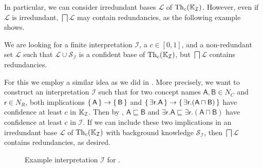 In particular, we can consider irredundant bases $\mathcal{L}$ of $\operatorname{Th}_c({\mathbb{K}}_{\mathcal{I}})$.  However, even if $\mathcal{L}$ is irredundant, $\bigsqcap \mathcal{L}$
may contain redundancies, as the following example shows.

\begin{Example}
  \label{expl:nonredundant-implicational-base-yields-redundant-gci-base}
  We are looking for a finite interpretation $\mathcal{I}$, a $c \in [0,1]$, and a
  non-redundant set $\mathcal{L}$ such that $\mathcal{L} \cup \mathcal{S}_{\mathcal{I}}$
  is a confident base of $\operatorname{Th}_c({\mathbb{K}}_{\mathcal{I}})$, but $\bigsqcap \mathcal{L}$
  contains redundancies.

  For this we employ a similar idea as we did in
  .  More precisely, we
  want to construct an interpretation $\mathcal{I}$ such that for two concept names
  $\mathsf{A}, \mathsf{B} \in N_C$ and $\mathsf{r} \in N_R$, both implications ${\{\,
    \mathsf{A} \,\}} \to {\ensuremath{\{\, \mathsf{B} \,\}}}$ and ${\{\, \mathsf{\exists r. A} \,\}} \to {\ensuremath{\{\,
    \mathsf{\exists r. (A \sqcap B)} \,\}}}$ have confidence at least $c$ in ${\mathbb{K}}_{\mathcal{I}}$.  Then by
  , $\mathsf{A
    \sqsubseteq B}$ and $\mathsf{\exists r. A \sqsubseteq \exists r. (A \sqcap B)}$ have
  confidence at least $c$ in $\mathcal{I}$.  If we can include these two implications in
  an irredundant base $\mathcal{L}$ of $\operatorname{Th}_c({\mathbb{K}}_{\mathcal{I}})$ with background
  knowledge $\mathcal{S}_{\mathcal{I}}$, then $\bigsqcap \mathcal{L}$ contains
  redundancies, as desired.

  \begin{figure}[tp]
    \centering
    \caption{Example interpretation $\mathcal{I}$ for
      .}
    \label{fig:example-interpretation-1}
  \end{figure}


\end{Example}
